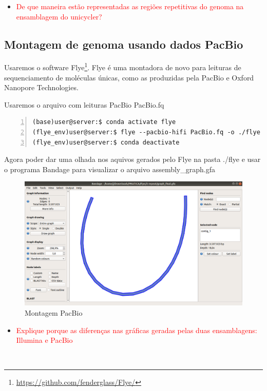 \documentclass[letter,11pt]{book}
\begin{document}
\begin{itemize}
\item \textcolor{red}{De que maneira estão representadas as regiões repetitivas do genoma na ensamblagem do unicycler?}
\end{itemize}

\subsection{Montagem de genoma usando dados PacBio}
Usaremos o software Flye\footnote{\url{https://github.com/fenderglass/Flye/}}. Flye é uma montadora de novo para leituras de sequenciamento de moléculas únicas, como as produzidas pela PacBio e Oxford Nanopore Technologies.

Usaremos o arquivo com leituras PacBio PacBio.fq

\begin{Verbatim}[commandchars=!\{\}, numbers=left,label= Montando leituras com Flye,frame=topline,fontsize=\scriptsize]
(base)user@server:$ conda activate flye
(flye_env)user@server:$ flye --pacbio-hifi PacBio.fq -o ./flye
(flye_env)user@server:$ conda deactivate
\end{Verbatim}

Agora poder dar uma olhada nos aquivos gerados pelo Flye na pasta ./flye e usar o programa Bandage para visualizar o arquivo assembly\_graph.gfa

\begin{figure}[ht]
\centering
   \includegraphics[width=12cm]{Figs/bandage_pacbio.png}
  \caption[Visualização da montagem do flye]{\label{bandage_pacbio}Montagem PacBio}
\end{figure}

\begin{itemize}
\item \textcolor{red}{Explique porque as diferenças nas gráficas geradas pelas duas ensamblagens: Illumina e PacBio}
\end{itemize}\
\end{document}
